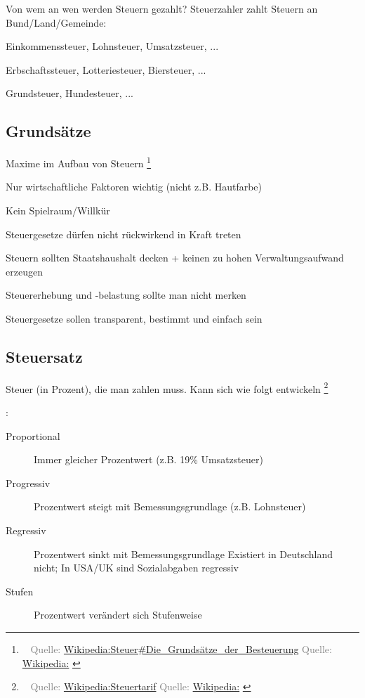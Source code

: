 \documentclass{beamer}
\newcommand{\n}{\hfill\\\vspace{0.25cm}}
\let\oldfootnote\footnote
\renewcommand{\footnote}[1]
{%
	\oldfootnote
	{
		\tiny
		\textcolor{gray}{\ #1}
	}%
}
\newcommand{\citewiki}[2][]
{%
	\footnote
	{
		\ifthenelse{\isempty{#1}}
		{
			Quelle: \href{https://de.wikipedia.org/wiki/#2}{Wikipedia:#2}
		}
		{
			Quelle: \href{https://de.wikipedia.org/wiki/#2}{Wikipedia:#1}
		}
	}
}
\begin{document}
			\begin{frame}{Von wem an wen werden Steuern gezahlt?}
				Steuerzahler zahlt Steuern an Bund/Land/Gemeinde:\n
				
				\begin{description}[An Gemeinde]
					\item[An Bund] Einkommenssteuer, Lohnsteuer, Umsatzsteuer, ...
					\item[An Land] Erbschaftssteuer, Lotteriesteuer, Biersteuer, ...
					\item[An Gemeinde] Grundsteuer, Hundesteuer, ...
				\end{description}
			\end{frame}
		
		\subsection{Grundsätze}
	
			\begin{frame}{Maxime im Aufbau von Steuern\citewiki{Steuer\#Die\_Grundsätze\_der\_Besteuerung}}
				\begin{description}[labelwidth=0cm]
					\item[Gerechtigkeit] Nur wirtschaftliche Faktoren wichtig (nicht z.B. Hautfarbe)
					\item[Gleichmäßigkeit] Kein Spielraum/Willkür
					\item[Rückwirkungsverbot] Steuergesetze dürfen nicht rückwirkend in Kraft treten
					\item[Ergiebigkeit] Steuern sollten Staatshaushalt decken + keinen zu hohen Verwaltungsaufwand erzeugen
					\item[Unmerklichkeit] Steuererhebung und -belastung sollte man nicht merken
					\item[Praktikabilität] Steuergesetze sollen transparent, bestimmt und einfach sein
				\end{description}
			\end{frame}
	
	\subsection{Steuersatz}
	
		\begin{frame}
			Steuer (in Prozent), die man zahlen muss. Kann sich wie folgt entwickeln\citewiki{Steuertarif}:\n
			\begin{description}
				\item[Proportional] Immer gleicher Prozentwert (z.B. 19\% Umsatzsteuer)
				\item[Progressiv] Prozentwert steigt mit Bemessungsgrundlage (z.B. Lohnsteuer)
				\item[Regressiv] Prozentwert sinkt mit Bemessungsgrundlage \vspace{0.1cm}\newline
				{\tiny Existiert in Deutschland nicht; In USA/UK sind Sozialabgaben regressiv\\}
				\item[Stufen] Prozentwert verändert sich Stufenweise
			\end{description}
		\end{frame}
	
\end{document}
